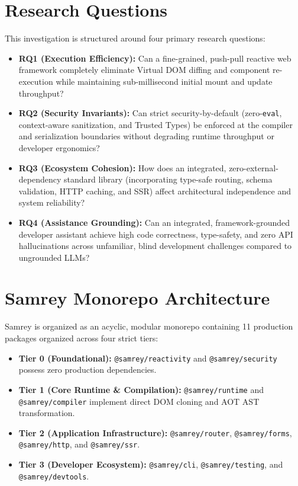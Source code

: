 \documentclass[10pt,journal,compsoc]{IEEEtran}
\begin{document}
\section{Research Questions}
This investigation is structured around four primary research questions:
\begin{itemize}
    \item \textbf{RQ1 (Execution Efficiency):} Can a fine-grained, push-pull reactive web framework completely eliminate Virtual DOM diffing and component re-execution while maintaining sub-millisecond initial mount and update throughput?
    \item \textbf{RQ2 (Security Invariants):} Can strict security-by-default (zero-\texttt{eval}, context-aware sanitization, and Trusted Types) be enforced at the compiler and serialization boundaries without degrading runtime throughput or developer ergonomics?
    \item \textbf{RQ3 (Ecosystem Cohesion):} How does an integrated, zero-external-dependency standard library (incorporating type-safe routing, schema validation, HTTP caching, and SSR) affect architectural independence and system reliability?
    \item \textbf{RQ4 (Assistance Grounding):} Can an integrated, framework-grounded developer assistant achieve high code correctness, type-safety, and zero API hallucinations across unfamiliar, blind development challenges compared to ungrounded LLMs?
\end{itemize}

\section{Samrey Monorepo Architecture}
Samrey is organized as an acyclic, modular monorepo containing 11 production packages organized across four strict tiers:
\begin{itemize}
    \item \textbf{Tier 0 (Foundational):} \texttt{@samrey/reactivity} and \texttt{@samrey/security} possess zero production dependencies.
    \item \textbf{Tier 1 (Core Runtime \& Compilation):} \texttt{@samrey/runtime} and \texttt{@samrey/compiler} implement direct DOM cloning and AOT AST transformation.
    \item \textbf{Tier 2 (Application Infrastructure):} \texttt{@samrey/router}, \texttt{@samrey/forms}, \texttt{@samrey/http}, and \texttt{@samrey/ssr}.
    \item \textbf{Tier 3 (Developer Ecosystem):} \texttt{@samrey/cli}, \texttt{@samrey/testing}, and \texttt{@samrey/devtools}.
\end{itemize}
\end{document}
